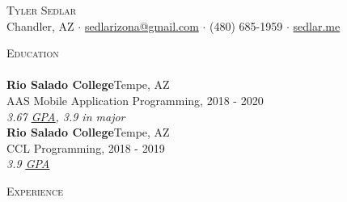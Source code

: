 \documentclass[a4paper]{article}
\newcommand{\lineunder} {
    \vspace*{-8pt} \\
    \hspace*{-18pt} \hrulefill \\
}
\newcommand{\header} [1] {
    {\hspace*{-18pt}\vspace*{6pt} \textsc{#1}}
    \vspace*{-6pt} \lineunder
}
\begin{document}
\vspace*{-40pt}
\setul{}{0.25pt}

\vspace*{-10pt}
\begin{center}
	{\Huge \scshape {Tyler Sedlar}}\\
	Chandler, AZ $\cdot$ \href{mailto:sedlarizona@gmail.com}{sedlarizona@gmail.com} $\cdot$ (480) 685-1959 $\cdot$ \href{https://sedlar.me/}{sedlar.me}\\
\end{center}

\header{Education}
\textbf{Rio Salado College}\hfill Tempe, AZ\\
AAS Mobile Application Programming, \hfill 2018 - 2020\\
\textit{3.67 \href{https://docs.google.com/spreadsheets/d/143DmVdsyjRVbH1ftcySxflvuNjioncAvJpj0vFbzpA8/edit?usp=sharing}{\ul{GPA}}, 3.9 in major}\\
\vspace{2mm}
\textbf{Rio Salado College}\hfill Tempe, AZ\\
CCL Programming, \hfill 2018 - 2019\\
\textit{3.9 \href{https://docs.google.com/spreadsheets/d/143DmVdsyjRVbH1ftcySxflvuNjioncAvJpj0vFbzpA8/edit?usp=sharing}{\ul{GPA}}}\\
\vspace{2mm}

\header{Experience}
\vspace{1mm}
\end{document}
